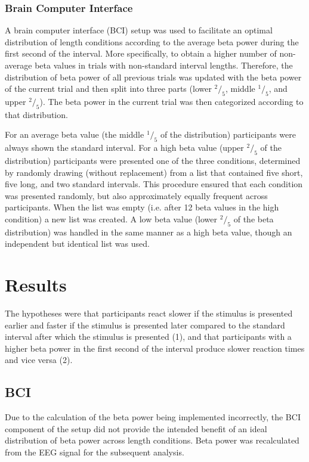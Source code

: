 \documentclass[man,floatsintext]{apa6} %
\begin{document}
\subsubsection{Brain Computer Interface}
A brain computer interface (BCI) setup was used to facilitate an
optimal distribution of length conditions according to the average
beta power during the first second of the interval. More specifically,
to obtain a higher number of non-average beta values in trials with
non-standard interval lengths. Therefore, the distribution of beta
power of all previous trials was updated with the beta power of the
current trial and then split into three parts (lower $^2/_5$,
middle $^1/_5$, and upper $^2/_5$). The beta power in the
current trial was then categorized according to that distribution.

For an average beta value (the middle $^1/_5$ of the
distribution) participants were always shown the standard
interval. For a high beta value (upper $^2/_5$ of the
distribution) participants were presented one of the three conditions,
determined by randomly drawing (without replacement) from a list that
contained five short, five long, and two standard intervals. This
procedure ensured that each condition was presented randomly, but also
approximately equally frequent across participants. When the list was
empty (i.e. after 12 beta values in the high condition) a new list was
created. A low beta value (lower $^2/_5$ of the beta
distribution) was handled in the same manner as a high beta value,
though an independent but identical list was used.



\section{Results}
The hypotheses were that participants react slower if the stimulus is
presented earlier and faster if the stimulus is presented later
compared to the standard interval after which the stimulus is
presented (1), and that participants with a higher beta power in the
first second of the interval produce slower reaction times and vice
versa (2).

\subsection{BCI}
Due to the calculation of the beta power being implemented
incorrectly, the BCI component of the setup did not provide the
intended benefit of an ideal distribution of beta power across length
conditions. Beta power was recalculated from the EEG signal for the
subsequent analysis.
\end{document}
